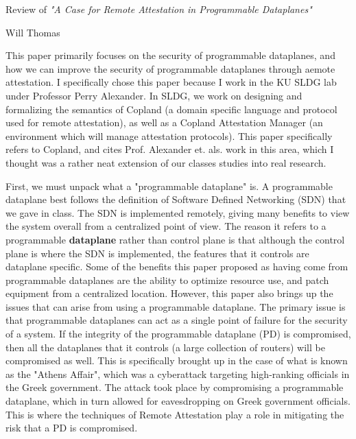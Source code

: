 \documentclass[12pt]{article}
\begin{document}
    \begin{center}
    \Large{Review of \emph{"A Case for Remote Attestation in Programmable Dataplanes"}} 
        \vspace{5pt}
        
        \normalsize{Will Thomas}
        \vspace{5pt}
    \end{center}

    This paper \cite{prog_data} primarily focuses on the security of programmable dataplanes, and how we can improve the security of programmable dataplanes through aemote attestation. I specifically chose this paper because I work in the KU SLDG lab under Professor Perry Alexander. In SLDG, we work on designing and formalizing the semantics of Copland (a domain specific language and protocol used for remote attestation), as well as a Copland Attestation Manager (an environment which will manage attestation protocols). This paper specifically refers to Copland, and cites Prof. Alexander et. als. work in this area, which I thought was a rather neat extension of our classes studies into real research. 
    
    First, we must unpack what a "programmable dataplane" is. A programmable dataplane best follows the definition of Software Defined Networking (SDN) that we gave in class. The SDN is implemented remotely, giving many benefits to view the system overall from a centralized point of view. The reason it refers to a programmable \textbf{dataplane} rather than control plane is that although the control plane is where the SDN is implemented, the features that it controls are dataplane specific. Some of the benefits this paper proposed as having come from programmable dataplanes are the ability to optimize resource use, and patch equipment from a centralized location. However, this paper also brings up the issues that can arise from using a programmable dataplane. The primary issue is that programmable dataplanes can act as a single point of failure for the security of a system. If the integrity of the programmable dataplane (PD) is compromised, then all the dataplanes that it controls (a large collection of routers) will be compromised as well. This is specifically brought up in the case of what is known as the "Athens Affair", which was a cyberattack targeting high-ranking officials in the Greek government. The attack took place by compromising a programmable dataplane, which in turn allowed for eavesdropping on Greek government officials. This is where the techniques of Remote Attestation play a role in mitigating the risk that a PD is compromised. 
\end{document}
